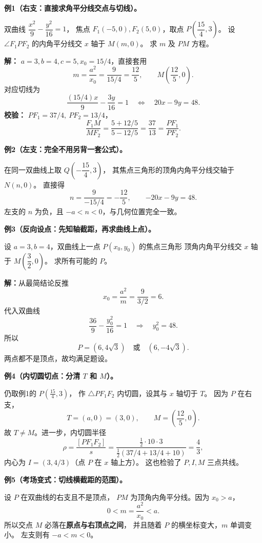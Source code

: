 \begin{examplebox}
\textbf{例1（右支：直接求角平分线交点与切线）。}

双曲线 $\dfrac{x^2}{9}-\dfrac{y^2}{16}=1$，
焦点 $F_1(-5,0),F_2(5,0)$，取点
$P\left(\dfrac{15}{4},3\right)$。
设 $\angle F_1PF_2$ 的内角平分线交 $x$ 轴于 $M(m,0)$。
求 $m$ 及 $PM$ 方程。

\textbf{解：} $a=3,b=4,c=5,x_0=15/4$，直接套用
\[
m=\frac{a^2}{x_0}=\frac{9}{15/4}=\boxed{\frac{12}{5}},
\qquad\boxed{M\left(\frac{12}{5},0\right)}.
\]
对应切线为
\[
\frac{(15/4)x}{9}-\frac{3y}{16}=1
\quad\Longleftrightarrow\quad
\boxed{20x-9y=48}.
\]
\textbf{校验：} $PF_1=37/4,\ PF_2=13/4$，
\[
\frac{F_1M}{MF_2}
=\frac{5+12/5}{5-12/5}=\frac{37}{13}
=\frac{PF_1}{PF_2}.
\]

\medskip
\textbf{例2（左支：完全不用另背一套公式）。}

在同一双曲线上取 $Q\left(-\dfrac{15}{4},3\right)$，
其焦点三角形的顶角内角平分线交轴于 $N(n,0)$。
直接得
\[
\boxed{n=\frac{9}{-15/4}=-\frac{12}{5}},
\qquad\boxed{-20x-9y=48}.
\]
左支的 $n$ 为负，且 $-a<n<0$，与几何位置完全一致。

\medskip
\textbf{例3（反向设点：先知轴截距，再求曲线上点）。}

设 $a=3,b=4$，双曲线上一点 $P(x_0,y_0)$ 的焦点三角形
顶角内角平分线交 $x$ 轴于 $M\left(\dfrac32,0\right)$。
求所有可能的 $P$。

\textbf{解：}从最简结论反推
\[
x_0=\frac{a^2}{m}=\frac{9}{3/2}=6.
\]
代入双曲线
\[
\frac{36}{9}-\frac{y_0^2}{16}=1
\quad\Longrightarrow\quad y_0^2=48.
\]
所以
\[
\boxed{P=(6,4\sqrt3)\quad\text{或}\quad(6,-4\sqrt3)}.
\]
两点都不是顶点，故均满足题设。

\medskip
\textbf{例4（内切圆切点：分清 $T$ 和 $M$）。}

仍取例1的 $P\left(\frac{15}{4},3\right)$，
作 $\triangle PF_1F_2$ 内切圆，设其与 $x$ 轴切于 $T$。
因为 $P$ 在右支，
\[
\boxed{T=(a,0)=(3,0)},\qquad
\boxed{M=\left(\frac{12}{5},0\right)}.
\]
故 $T\ne M$。进一步，内切圆半径
\[
\rho=\frac{[PF_1F_2]}{s}
=\frac{\frac12\cdot10\cdot3}{\frac12(37/4+13/4+10)}
=\boxed{\frac43},
\]
内心为 $I=(3,4/3)$（点 $P$ 在 $x$ 轴上方）。
这也检验了 $P,I,M$ 三点共线。

\medskip
\textbf{例5（考场变式：切线横截距的范围）。}

设 $P$ 在双曲线的右支且不是顶点，
$PM$ 为顶角内角平分线。因为 $x_0>a$，
\[
0<m=\frac{a^2}{x_0}<a.
\]
所以交点 $M$ 必落在\textbf{原点与右顶点之间}，
并且随着 $P$ 的横坐标变大，$m$ 单调变小。
左支则有 $-a<m<0$。
\end{examplebox}
